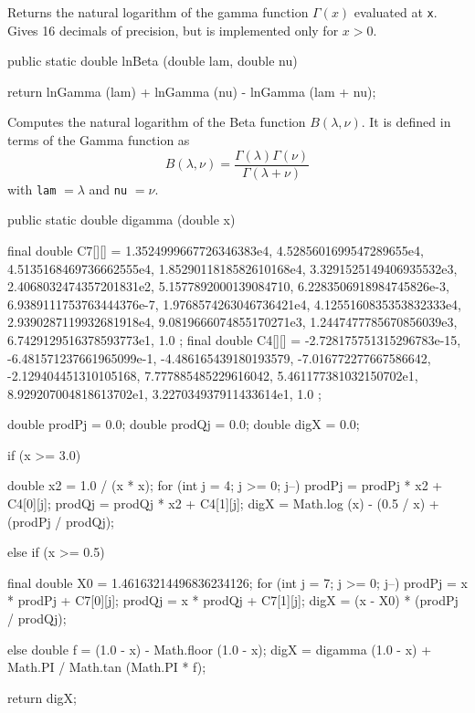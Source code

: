  \begin{tabb} Returns the natural logarithm of the gamma function $\Gamma(x)$
   evaluated at \texttt{x}.
   Gives 16 decimals of precision, but is implemented only for $x>0$.
  \end{tabb}
  \begin{htmlonly}
 \end{htmlonly}
\begin{code}

   public static double lnBeta (double lam, double nu)\begin{hide} {
      return lnGamma (lam) + lnGamma (nu) - lnGamma (lam + nu);
   }\end{hide}
\end{code}
\begin{tabb} Computes the natural logarithm of the Beta function
 $B(\lambda, \nu)$.  It is defined in terms of the Gamma function as
 $$
  B(\lambda, \nu) = \frac{\Gamma(\lambda)\Gamma(\nu)}{\Gamma(\lambda + \nu)}
 $$
 with \texttt{lam} $=\lambda$ and  \texttt{nu} $=\nu$.
\end{tabb}
\begin{code}

   public static double digamma (double x)\begin{hide} {
      final double C7[][] = {
       {1.3524999667726346383e4, 4.5285601699547289655e4, 4.5135168469736662555e4,
        1.8529011818582610168e4, 3.3291525149406935532e3, 2.4068032474357201831e2,
        5.1577892000139084710, 6.2283506918984745826e-3},
       {6.9389111753763444376e-7, 1.9768574263046736421e4, 4.1255160835353832333e4,
          2.9390287119932681918e4, 9.0819666074855170271e3,
          1.2447477785670856039e3, 6.7429129516378593773e1, 1.0}
      };
      final double C4[][] = {
       {-2.728175751315296783e-15, -6.481571237661965099e-1, -4.486165439180193579,
        -7.016772277667586642, -2.129404451310105168},
       {7.777885485229616042, 5.461177381032150702e1,
        8.929207004818613702e1, 3.227034937911433614e1, 1.0}
      };

      double prodPj = 0.0;
      double prodQj = 0.0;
      double digX = 0.0;

      if (x >= 3.0) {
         double x2 = 1.0 / (x * x);
         for (int j = 4; j >= 0; j--) {
            prodPj = prodPj * x2 + C4[0][j];
            prodQj = prodQj * x2 + C4[1][j];
         }
         digX = Math.log (x) - (0.5 / x) + (prodPj / prodQj);

      } else if (x >= 0.5) {
         final double X0 = 1.46163214496836234126;
         for (int j = 7; j >= 0; j--) {
            prodPj = x * prodPj + C7[0][j];
            prodQj = x * prodQj + C7[1][j];
         }
         digX = (x - X0) * (prodPj / prodQj);

      } else {
         double f = (1.0 - x) - Math.floor (1.0 - x);
         digX = digamma (1.0 - x) + Math.PI / Math.tan (Math.PI * f);
      }

      return digX;
   }\end{hide}
\end{code}
